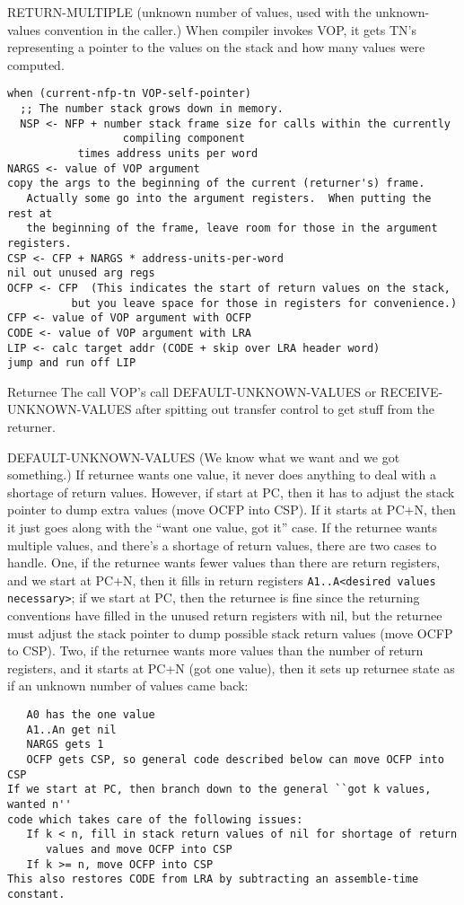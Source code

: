 RETURN-MULTIPLE
(unknown number of values, used with the unknown-values convention in
 the caller.)
When compiler invokes VOP, it gets TN's representing a pointer to the
values on the stack and how many values were computed.

\begin{verbatim}
when (current-nfp-tn VOP-self-pointer)
  ;; The number stack grows down in memory.
  NSP <- NFP + number stack frame size for calls within the currently
                  compiling component
	       times address units per word
NARGS <- value of VOP argument
copy the args to the beginning of the current (returner's) frame.
   Actually some go into the argument registers.  When putting the rest at
   the beginning of the frame, leave room for those in the argument registers.
CSP <- CFP + NARGS * address-units-per-word
nil out unused arg regs
OCFP <- CFP  (This indicates the start of return values on the stack,
	      but you leave space for those in registers for convenience.)
CFP <- value of VOP argument with OCFP
CODE <- value of VOP argument with LRA
LIP <- calc target addr (CODE + skip over LRA header word)
jump and run off LIP
\end{verbatim}

Returnee
The call VOP's call DEFAULT-UNKNOWN-VALUES or RECEIVE-UNKNOWN-VALUES after
spitting out transfer control to get stuff from the returner.

DEFAULT-UNKNOWN-VALUES
(We know what we want and we got something.)
If returnee wants one value, it never does anything to deal with a shortage
of return values.  However, if start at PC, then it has to adjust the stack
pointer to dump extra values (move OCFP into CSP).  If it starts at PC+N,
then it just goes along with the ``want one value, got it'' case.
If the returnee wants multiple values, and there's a shortage of return
values, there are two cases to handle.  One, if the returnee wants fewer
values than there are return registers, and we start at PC+N, then it fills
in return registers \verb|A1..A<desired values necessary>|; if we start at PC,
then the returnee is fine since the returning conventions have filled in
the unused return registers with nil, but the returnee must adjust the
stack pointer to dump possible stack return values (move OCFP to CSP).
Two, if the returnee wants more values than the number of return registers,
and it starts at PC+N (got one value), then it sets up returnee state as if
an unknown number of values came back:
\begin{verbatim}
   A0 has the one value
   A1..An get nil
   NARGS gets 1
   OCFP gets CSP, so general code described below can move OCFP into CSP
If we start at PC, then branch down to the general ``got k values, wanted n''
code which takes care of the following issues:
   If k < n, fill in stack return values of nil for shortage of return
      values and move OCFP into CSP
   If k >= n, move OCFP into CSP
This also restores CODE from LRA by subtracting an assemble-time constant.
\end{verbatim}


